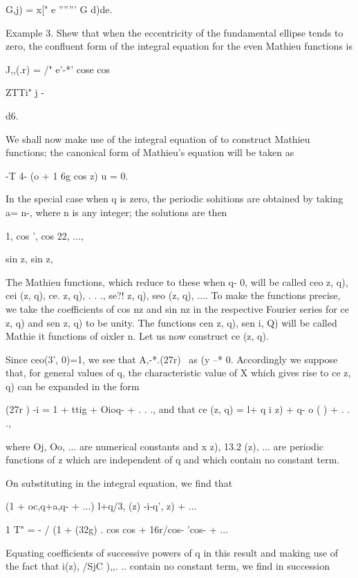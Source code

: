 G,j) = x[" e ''''''' G d)de.

Example 3. Shew that when the eccentricity of the fundamental ellipse
tends to zero, the confluent form of the integral equation for the
even Mathieu functions is

J,,(.r) = /" e'-*' cose cos

ZTTi" j -

d6.


We shall now make use of the integral equation of  to construct
Mathieu functions; the canonical form of Mathieu's equation will be
taken as

-T 4- (o + 1 6g cos z) u = 0.

%
%

In the special case when q is zero, the periodic sohitions are
obtained by taking a= n-, where n is any integer; the solutions are
then

1, cos ', cos 22, ...,

sin z, sin z,

The Mathieu functions, which reduce to these when q- 0, will be called
ceo z, q), cei (z, q), ce. z, q), . . ., se?! z, q), seo (z, q), ....
To make the functions precise, we take the coefficients of cos nz and
sin nz in the respective Fourier series for ce z, q) and sen z, q) to
be unity. The functions cen z, q), sen i, Q) will be called Mathie it
functions of oixler n. Let us now construct ce (z, q).

Since ceo(3', 0)=1, we see that A,-*.(27r)~ as (y --* 0. Accordingly
we suppose that, for general values of q, the characteristic value of
X which gives rise to ce z, q) can be expanded in the form

(27r ) -i = 1 + ttig + Oioq- + . . ., and that ce (z, q) = l+ q i z)
+ q- o ( ) + . . .,

where Oj, Oo, ... are numerical constants and x z), 13.2 (z), ... are
periodic functions of z which are independent of q and which contain
no constant term.

On substituting in the integral equation, we find that

(1 + oc,q+a,q- + ...) l+q/3, (z) -i-q', z) + ...

1 T" = - / (1 + \/(32g) . cos cos + 16r/cos- 'cos- + ...

Equating coefficients of successive powers of q in this result and
making use of the fact that i(z), /SjC ),,. .. contain no constant
term, we find in succession

